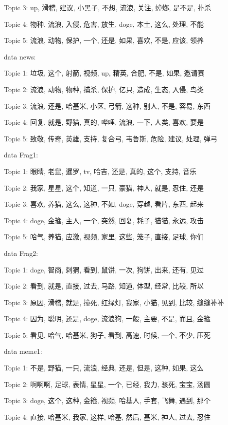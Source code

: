 \documentclass[12pt,a4paper]{ctexart}
\begin{document}
Topic 3: up, 滑稽, 建议, 小黑子, 不想, 流浪, 关注, 蟑螂, 是不是, 扑杀

Topic 4: 物种, 流浪, 入侵, 危害, 放生, doge, 本土, 这么, 处理, 不能

Topic 5: 流浪, 动物, 保护, 一个, 还是, 如果, 喜欢, 不是, 应该, 领养

data news:

Topic 1: 垃圾, 这个, 射箭, 视频, up, 精英, 合肥, 不是, 如果, 邀请赛

Topic 2: 流浪, 动物, 物种, 捕杀, 保护, 亿只, 造成, 生态, 入侵, 鸟类

Topic 3: 流浪, 还是, 哈基米, 小区, 弓箭, 这种, 别人, 不是, 容易, 东西

Topic 4: 回复, 就是, 野猫, 真的, 哔哩, 流浪, 一下, 人类, 喜欢, 要是

Topic 5: 致敬, 传奇, 英雄, 支持, 复合弓, 韦鲁斯, 危险, 建议, 处理, 弹弓

data Frag1:

Topic 1: 眼睛, 老鼠, 暹罗, tv, 哈吉, 还是, 真的, 这个, 支持, 音乐

Topic 2: 我家, 星星, 这个, 知道, 一只, 豪猫, 神人, 就是, 忍住, 还是

Topic 3: 喜欢, 养猫, 这么, 这种, 不如, doge, 穿越, 看片, 东西, 起来

Topic 4: doge, 金箍, 主人, 一个, 突然, 回复, 耗子, 猫猫, 永远, 攻击

Topic 5: 哈气, 养猫, 应激, 视频, 家里, 这些, 笼子, 直接, 足球, 你们

data Frag2:

Topic 1: doge, 智商, 刺猬, 看到, 鼠饼, 一次, 狗饼, 出来, 还有, 见过

Topic 2: 看到, 就是, 直接, 过去, 马路, 知道, 体型, 经常, 比较, 所以

Topic 3: 原因, 滑稽, 就是, 撞死, 红绿灯, 我家, 小猫, 见到, 比较, 缝缝补补

Topic 4: 因为, 聪明, 还是, doge, 流浪狗, 一般, 主要, 不是, 而且, 金箍

Topic 5: 看见, 哈气, 哈基米, 狗子, 看到, 高速, 时候, 一个, 不少, 压死

data meme1:

Topic 1: 不是, 野猫, 一只, 流浪, 经典, 还是, 但是, 这种, 如果, 这么

Topic 2: 啊啊啊, 足球, 表情, 星星, 一个, 已经, 我力, 骇死, 宝宝, 汤圆

Topic 3: doge, 这个, 这种, 金箍, 视频, 哈基人, 手套, 飞舞, 遇到, 那个

Topic 4: 直接, 哈基米, 我家, 这样, 哈基, 然后, 基米, 神人, 过去, 忍住
\end{document}
